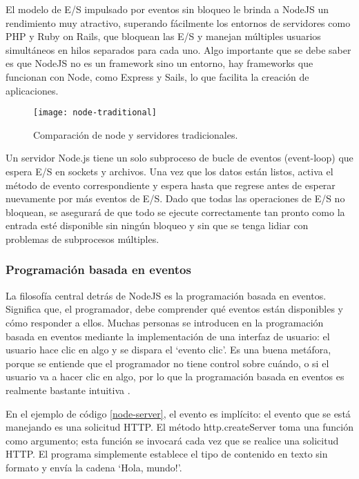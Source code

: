 El modelo de E/S impulsado por eventos sin bloqueo le brinda a NodeJS un rendimiento muy atractivo, superando fácilmente los entornos de servidores como PHP y Ruby on Rails, que bloquean las E/S y manejan múltiples usuarios simultáneos en hilos separados para cada uno. Algo importante que se debe saber es que NodeJS no es un framework sino un entorno, hay frameworks que funcionan con Node, como Express y Sails, lo que facilita la creación de aplicaciones.
\vspace{0.8cm}

\begin{figure}[H]
  \centering
  \texttt{[image: node-traditional]}
  \caption{Comparación de node y servidores tradicionales.}
\end{figure}

Un servidor Node.js tiene un solo subproceso de bucle de eventos (event-loop) que espera E/S en sockets y archivos. Una vez que los datos están listos, activa el método de evento correspondiente y espera hasta que regrese antes de esperar nuevamente por más eventos de E/S. Dado que todas las operaciones de E/S no bloquean, se asegurará de que todo se ejecute correctamente tan pronto como la entrada esté disponible sin ningún bloqueo y sin que se tenga lidiar con problemas de subprocesos múltiples.

\newpage
\subsubsection{Programación basada en eventos}
La filosofía central detrás de NodeJS es la programación basada en eventos. Significa que, el programador,  debe comprender qué eventos están disponibles y cómo responder a ellos. Muchas personas se introducen en la programación basada en eventos mediante la implementación de una interfaz de usuario: el usuario hace clic en algo y se dispara el `evento clic'. Es una buena metáfora, porque se entiende que el programador no tiene control sobre cuándo, o si el usuario va a hacer clic en algo, por lo que la programación basada en eventos es realmente bastante intuitiva \cite{ethan}.
\vspace{0.8cm}


En el ejemplo de código \ref{node-server}, el evento es implícito: el evento que se está manejando es una solicitud HTTP. El método http.createServer toma una función como argumento; esta función se invocará cada vez que se realice una solicitud HTTP. El programa simplemente establece el tipo de contenido en texto sin formato y envía la cadena `Hola, mundo!'.
